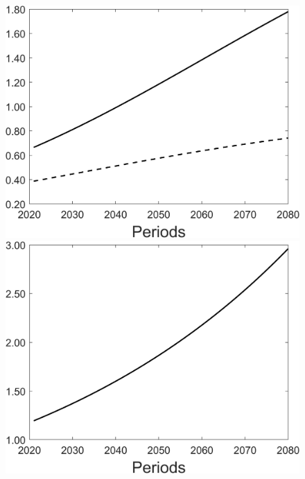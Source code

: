 \begin{figure}[h!!!]
\begin{minipage}[]{0.32\textwidth}
\end{minipage}
\begin{minipage}[]{0.32\textwidth}
	\includegraphics[width=1\textwidth]{../../codding_model/Own/figures/Rep_agent/staticBAU_LF_separate_pc_periods59_eppsilon0.40_zeta1.40_Ad08_Ac04_thetac0.70_thetad0.56_HetGrowth1_tauul0.181_util0_withtarget0_lgd0.png}
\end{minipage}
	\begin{minipage}[]{0.32\textwidth}
		\includegraphics[width=1\textwidth]{../../codding_model/Own/figures/Rep_agent/staticBAU_LF_separate_ydyc_periods59_eppsilon0.40_zeta1.40_Ad08_Ac04_thetac0.70_thetad0.56_HetGrowth1_tauul0.181_util0_withtarget0_lgd0.png}
	\end{minipage}
\end{figure}

